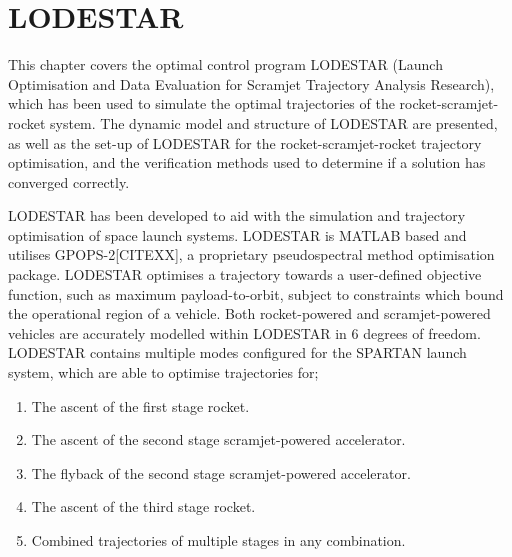 
\cleardoublepage
\chapter{LODESTAR}\label{chapter:LODESTAR}	
This chapter covers the optimal control program LODESTAR (Launch Optimisation and Data Evaluation for Scramjet Trajectory Analysis Research), which has been used to simulate the optimal trajectories of the rocket-scramjet-rocket system. The dynamic model and structure of LODESTAR are presented, as well as the set-up of LODESTAR for the rocket-scramjet-rocket trajectory optimisation, and the verification methods used to determine if a solution has converged correctly.

LODESTAR has been developed to aid with the simulation and trajectory optimisation of space launch systems. 
LODESTAR is MATLAB based and utilises GPOPS-2[CITEXX], a proprietary pseudospectral method optimisation package.
 LODESTAR optimises a trajectory towards a user-defined objective function, such as maximum payload-to-orbit, subject to constraints which bound the operational region of a vehicle. Both rocket-powered and scramjet-powered vehicles are accurately modelled within LODESTAR in 6 degrees of freedom. LODESTAR contains multiple modes configured for the SPARTAN launch system, which are able to optimise trajectories for;

\begin{enumerate}
 \item The ascent of the first stage rocket.
 \item The ascent of the second stage scramjet-powered accelerator.
 \item The flyback of the second stage scramjet-powered accelerator.
 \item The ascent of the third stage rocket.
 \item Combined trajectories of multiple stages in any combination.
\end{enumerate}

